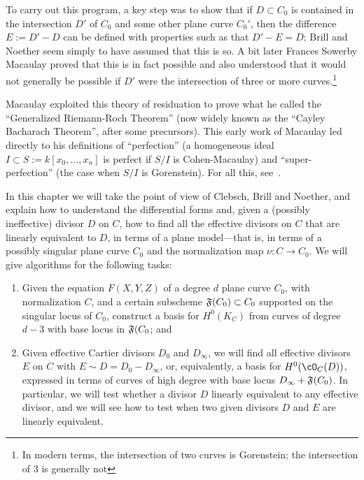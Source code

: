 To carry out this program, a key step was to show that if $D\subset C_0$ is contained in the intersection
$D'$ of $C_0$ and some other plane curve $C_0'$, then the difference 
$E := D'-D$ can be defined with properties such as that $D'-E = D$; Brill and Noether seem simply to have assumed that this is so. A bit later Frances Sowerby Macaulay proved that this is in fact possible  and also understood that it would not generally be possible if $D'$ were the intersection of three or more curves.\footnote{In modern terms, the intersection of two curves is Gorenstein; the intersection of 3 is generally not}

Macaulay exploited this theory of residuation  to prove what he called the ``Generalized Riemann-Roch Theorem'' (now widely known as the ``Cayley Bacharach Theorem'', after some precursors). This early work of Macaulay led directly to his definitions of  ``perfection'' (a homogeneous ideal
$I  \subset S:= k[x_0, \dots, x_n]$ is perfect if $S/I$ is Cohen-Macaulay) and ``super-perfection'' (the case when $S/I$ is
Gorenstein). For all this, see~\cite{Eisenbud-Gray}.

In this chapter we will take the point of view of Clebsch, Brill and Noether, and explain how to understand 
the differential forms and, given a (possibly ineffective) divisor $D$ on $C$, how to find all the 
effective divisors on $C$ that are linearly equivalent to $D$, in terms of a plane model---that is, 
in terms of a possibly singular plane curve $C_{0}$ and the normalization map $\nu: C\to C_{0}$.
We will give algorithms for the following tasks:

\begin{enumerate}
\item Given the equation $F(X,Y,Z)$ of a degree $d$ plane curve $C_0$, with normalization $C$,
and a certain subscheme $\adj(C_{0})\subset C_{0}$ supported on the singular locus of $C_{0}$,
construct a basis for $H^0(K_C)$ from curves of degree $d-3$ with base locus in $\adj(C_{0}$; and

\item  Given effective Cartier divisors $D_{0}$ and $D_{\infty}$, we will  find all effective divisors $E$ on $C$ with $E \sim D = D_{0}- D_{\infty}$, or, equivalently, a basis for $H^0(\cO_C(D))$, expressed in terms of curves of high degree with  base locus $D_{\infty}+\adj(C_{0})$. In particular, we will test whether a divisor $D$ linearly equivalent to any effective divisor, and we will see how to test when two given divisors $D$ and $E$ are linearly equivalent. 
\end{enumerate}

